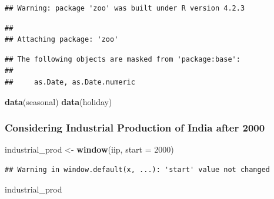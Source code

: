 \documentclass[
]{article}
\newenvironment{Shaded}{\begin{snugshade}}{\end{snugshade}}
\newcommand{\AttributeTok}[1]{\textcolor[rgb]{0.13,0.29,0.53}{#1}}
\newcommand{\DecValTok}[1]{\textcolor[rgb]{0.00,0.00,0.81}{#1}}
\newcommand{\FunctionTok}[1]{\textcolor[rgb]{0.13,0.29,0.53}{\textbf{#1}}}
\newcommand{\NormalTok}[1]{#1}
\newcommand{\OtherTok}[1]{\textcolor[rgb]{0.56,0.35,0.01}{#1}}
\begin{document}
\begin{verbatim}
## Warning: package 'zoo' was built under R version 4.2.3
\end{verbatim}

\begin{verbatim}
## 
## Attaching package: 'zoo'
\end{verbatim}

\begin{verbatim}
## The following objects are masked from 'package:base':
## 
##     as.Date, as.Date.numeric
\end{verbatim}

\begin{Shaded}
\begin{Highlighting}[]
\FunctionTok{data}\NormalTok{(seasonal)}
\FunctionTok{data}\NormalTok{(holiday)}
\end{Highlighting}
\end{Shaded}

\hypertarget{considering-industrial-production-of-india-after-2000}{%
\subsubsection{Considering Industrial Production of India after
2000}\label{considering-industrial-production-of-india-after-2000}}

\begin{Shaded}
\begin{Highlighting}[]
\NormalTok{industrial\_prod }\OtherTok{\textless{}{-}} \FunctionTok{window}\NormalTok{(iip, }\AttributeTok{start =} \DecValTok{2000}\NormalTok{)}
\end{Highlighting}
\end{Shaded}

\begin{verbatim}
## Warning in window.default(x, ...): 'start' value not changed
\end{verbatim}

\begin{Shaded}
\begin{Highlighting}[]
\NormalTok{industrial\_prod}
\end{Highlighting}
\end{Shaded}
\end{document}
